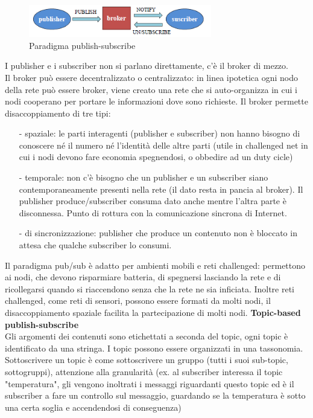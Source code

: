 \documentclass[12pt,italian]{report}
\begin{document}
\begin{figure}[h]
	\centering
\includegraphics[width=80mm]{img/publishsub.PNG}
\caption{Paradigma publish-subscribe}
\label{fig:pps}
\end{figure}
\bigbreak
\noindent I publisher e i subscriber non si parlano direttamente, c'è il broker di mezzo. \\ Il broker può essere decentralizzato o centralizzato: in linea ipotetica ogni nodo della rete può essere broker, viene creato una rete che si auto-organizza in cui i nodi cooperano per portare le informazioni dove sono richieste. 
\bigbreak
\noindent Il broker permette disaccoppiamento di tre tipi:
\begin{itemize}
    \item [-] spaziale: le parti interagenti (publisher e subscriber) non hanno bisogno di conoscere né il numero né l'identità delle altre parti (utile in challenged net in cui i nodi devono fare economia spegnendosi, o obbedire ad un duty cicle)
    \item [-] temporale: non c'è bisogno che un publisher e un subscriber siano contemporaneamente presenti nella rete (il dato resta in pancia al broker). Il publisher produce/subscriber consuma dato anche mentre l'altra parte è disconnessa. Punto di rottura con la comunicazione sincrona di Internet. 
    \item [-] di sincronizzazione: publisher che produce un contenuto non è bloccato in attesa che qualche subscriber lo consumi. 
\end{itemize}
Il paradigma pub/sub è adatto per ambienti mobili e reti challenged: permettono ai nodi, che devono risparmiare batteria, di spegnersi lasciando la rete e di ricollegarsi quando si riaccendono senza che la rete ne sia inficiata. Inoltre reti challenged, come reti di sensori, possono essere formati da molti nodi, il disaccoppiamento spaziale facilita la partecipazione di molti nodi. 
\bigbreak
\noindent \textbf{Topic-based publish-subscribe} \\
Gli argomenti dei contenuti sono etichettati a seconda del topic, ogni topic è identificato da una stringa. I topic possono essere organizzati in una tassonomia. Sottoscrivere un topic è come sottoscrivere un gruppo (tutti i suoi sub-topic, sottogruppi), attenzione alla granularità (ex. al subscriber interessa il topic "temperatura", gli vengono inoltrati i messaggi riguardanti questo topic ed è il subscriber a fare un controllo sul messaggio, guardando se la temperatura è sotto una certa soglia e accendendosi di conseguenza)
\end{document}
